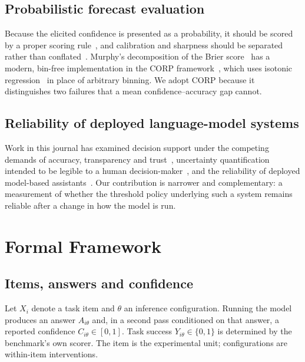 \documentclass[information,article,submit,moreauthors]{Definitions/mdpi}
\begin{document}
\subsection{Probabilistic forecast evaluation}

Because the elicited confidence is presented as a probability, it should be
scored by a proper scoring rule~\cite{brier1950,gneiting2007proper}, and
calibration and sharpness should be separated rather than
conflated~\cite{gneiting2007sharpness}. Murphy's decomposition of the Brier
score~\cite{murphy1973} has a modern, bin-free implementation in the CORP
framework~\cite{dimitriadis2021corp,dimitriadis2024triptych}, which uses
isotonic regression~\cite{ayer1955} in place of arbitrary binning. We adopt CORP
because it distinguishes two failures that a mean confidence--accuracy gap
cannot.

\subsection{Reliability of deployed language-model systems}

Work in this journal has examined decision support under the competing demands
of accuracy, transparency and trust~\cite{kovari2024decision}, uncertainty
quantification intended to be legible to a human
decision-maker~\cite{bhattacharjee2025entropy}, and the reliability of deployed
model-based assistants~\cite{alghamdi2024healthcare,darwish2025hallucination}.
Our contribution is narrower and complementary: a measurement of whether the
threshold policy underlying such a system remains reliable after a change in
how the model is run.

\section{Formal Framework}
\label{sec:framework}

\subsection{Items, answers and confidence}

Let $X_i$ denote a task item and $\theta$ an inference configuration. Running
the model produces an answer $A_{i\theta}$ and, in a second pass conditioned on
that answer, a reported confidence $C_{i\theta} \in [0,1]$. Task success
$Y_{i\theta} \in \{0,1\}$ is determined by the benchmark's own scorer. The item
is the experimental unit; configurations are within-item interventions.
\end{document}
